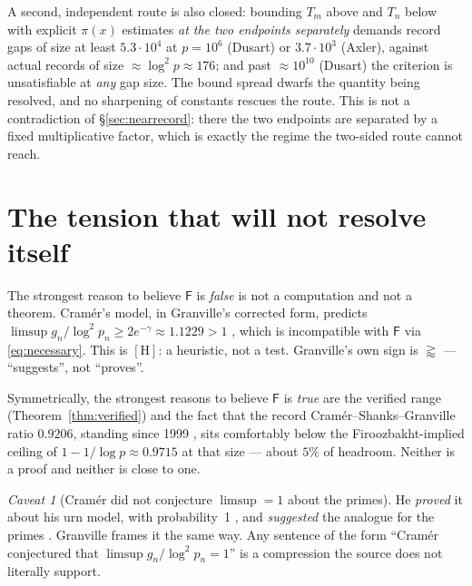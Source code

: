 \documentclass[11pt,a4paper]{article}
\theoremstyle{plain}
\theoremstyle{definition}
\theoremstyle{remark}
\newtheorem{hazard}[theorem]{Caveat}
\newcommand{\cH}{{[\mathrm{H}]}}
\newcommand{\Fb}{\mathsf{F}}
\begin{document}
A second, independent route is also closed: bounding $T_m$ above and $T_n$ below with
explicit $\pi(x)$ estimates \emph{at the two endpoints separately} demands record gaps of
size at least $5.3\cdot10^4$ at $p = 10^6$ (Dusart) or $3.7\cdot10^3$ (Axler), against actual
records of size $\approx \log^2 p \approx 176$; and past $\approx 10^{10}$ (Dusart) the
criterion is unsatisfiable at \emph{any} gap size. The bound spread dwarfs the quantity being
resolved, and no sharpening of constants rescues the route. This is not a contradiction of
\S\ref{sec:nearrecord}: there the two endpoints are separated by a fixed multiplicative
factor, which is exactly the regime the two-sided route cannot reach.

\section{The tension that will not resolve itself}
\label{sec:tension}

The strongest reason to believe $\Fb$ is \emph{false} is not a computation and not a theorem.
Cram\'er's model, in Granville's corrected form, predicts
$\limsup g_n/\log^2 p_n \ge 2e^{-\gamma} \approx 1.1229 > 1$
\cite[preprint p.~12]{granville1995cramer}, which is incompatible with $\Fb$ via
\eqref{eq:necessary}. This is $\cH$: a heuristic, not a test. Granville's own sign is
$\gtrapprox$ --- ``suggests'', not ``proves''.

Symmetrically, the strongest reasons to believe $\Fb$ is \emph{true} are the verified range
(Theorem~\ref{thm:verified}) and the fact that the record Cram\'er--Shanks--Granville ratio
$0.9206$, standing since 1999 \cite{oeisA111943}, sits comfortably below the
Firoozbakht-implied ceiling of $1 - 1/\log p \approx 0.9715$ at that size --- about $5\%$ of
headroom. Neither is a proof and neither is close to one.

\begin{hazard}[Cram\'er did not conjecture $\limsup = 1$ about the primes]
He \emph{proved} it about his urn model, with probability~1
\cite[p.~27]{cramer1936order}, and \emph{suggested} the analogue for the primes
\cite[p.~24, eq.~(4)]{cramer1936order}. Granville frames it the same way. Any sentence of the
form ``Cram\'er conjectured that $\limsup g_n/\log^2 p_n = 1$'' is a compression the source
does not literally support.
\end{hazard}

\end{document}
